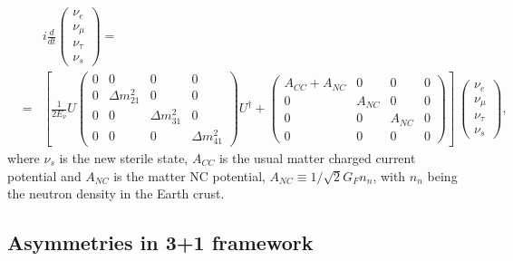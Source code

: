 \documentclass[12pt]{article}
\begin{document}
\begin{eqnarray} 
&& i\frac{d}{dt} \left( \begin{array}{c} 
                   \nu_e \\ \nu_\mu \\ \nu_\tau  \\ \nu_s
                   \end{array}  \right) =\\ 
 &=& \left[\frac{1}{2 E_\nu} U \left( \begin{array}{cccc}
                   0   & 0          & 0  & 0 \\
                   0   & \Delta m^2_{21}  & 0 & 0 \\
                   0   & 0           &  \Delta m^2_{31} & 0 \\
                   0 & 0 & 0 & \Delta m^2_{41}
                   \end{array} \right) U^{\dagger} +  
                   \left( \begin{array}{cccc}
            A_{CC} + A_{NC}     & 0 & 0 & 0 \\
            0  & A_{NC}  & 0 & 0 \\
            0 & 0 & A_{NC} & 0 \\
            0 & 0 & 0 & 0
                   \end{array} 
                   \right) \right] ~
\left( \begin{array}{c} 
                   \nu_e \\ \nu_\mu \\ \nu_\tau \\
                   \nu_s
                   \end{array}  \right) ,
\label{eq:matter3p1}\nonumber
\end{eqnarray}
where $\nu_s$ is the new sterile state, $A_{CC}$ is the usual matter charged current potential and $A_{NC}$ is the matter NC potential, $A_{NC}\equiv 1/ \sqrt 2 G_F n_n$, with $n_n$ being the neutron density in the Earth crust. 

\subsection{Asymmetries in 3+1 framework}
\end{document}
